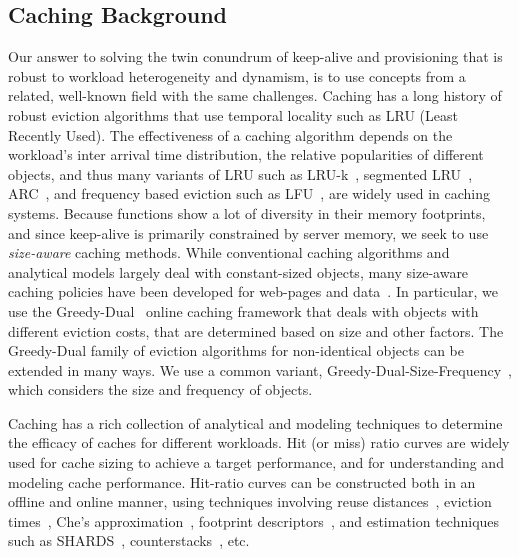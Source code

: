 \subsection{Caching Background}


Our answer to solving the twin conundrum of keep-alive and provisioning that is robust to workload heterogeneity and dynamism, is to use concepts from a related, well-known field with the same challenges. 
%
Caching has a long history of robust eviction algorithms that use temporal locality such as  LRU (Least Recently Used). 
The effectiveness of a caching algorithm depends on the workload's inter arrival time distribution, the relative popularities of different objects, and thus many variants of LRU such as LRU-k~\cite{o1993lru}, segmented LRU~\cite{cheng2000lru}, ARC~\cite{megiddo2003arc}, and frequency based eviction such as LFU~\cite{einziger2017tinylfu}, are widely used in caching systems. 
Because functions show a lot of diversity in their memory footprints, and since keep-alive is primarily constrained by server memory, we seek to use \emph{size-aware} caching methods. 
While conventional caching algorithms and analytical models largely deal with constant-sized objects, many size-aware caching policies have been developed for web-pages and data~\cite{cao_irani_1997}. 
In particular, we use the Greedy-Dual~\cite{young_gd_orig_94} online caching framework that deals with objects with different eviction costs, that are determined based on size and other factors.
The Greedy-Dual family of eviction algorithms for non-identical objects can be extended in many ways.
We use a common variant, Greedy-Dual-Size-Frequency~\cite{gdsf, gdfs_2001,cherkasova2001role}, which considers the size and frequency of objects. 


Caching has a rich collection of analytical and modeling techniques to determine the efficacy of caches for different workloads.
Hit (or miss) ratio curves are widely used for cache sizing to achieve a target performance, and for understanding and modeling cache performance. 
Hit-ratio curves can be constructed both in an offline and online manner, using techniques involving reuse distances~\cite{osca_atc20}, eviction times~\cite{hu2016kinetic}, Che's approximation~\cite{che2002hierarchical}, footprint descriptors~\cite{sundarrajan2017footprint}, and estimation techniques such as SHARDS~\cite{shards}, counterstacks~\cite{counterstacks}, etc. 

